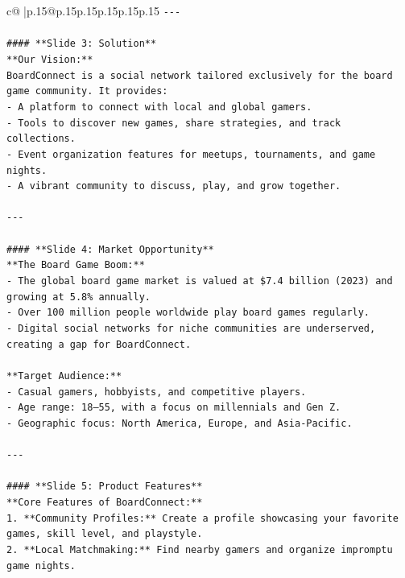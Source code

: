 \documentclass{article}
\begin{document}
{\begin{supertabular}{c@{$\;$}|p{.15\linewidth}@{}p{.15\linewidth}p{.15\linewidth}p{.15\linewidth}p{.15\linewidth}p{.15\linewidth}}
{{{\texttt{{-}{-}{-}} \\
\\ 
\texttt{\#\#\#\# **Slide 3: Solution**} \\
\texttt{**Our Vision:**  } \\
\texttt{BoardConnect is a social network tailored exclusively for the board game community. It provides:  } \\
\texttt{{-} A platform to connect with local and global gamers.  } \\
\texttt{{-} Tools to discover new games, share strategies, and track collections.  } \\
\texttt{{-} Event organization features for meetups, tournaments, and game nights.  } \\
\texttt{{-} A vibrant community to discuss, play, and grow together.} \\
\\ 
\texttt{{-}{-}{-}} \\
\\ 
\texttt{\#\#\#\# **Slide 4: Market Opportunity**} \\
\texttt{**The Board Game Boom:**  } \\
\texttt{{-} The global board game market is valued at \$7.4 billion (2023) and growing at 5.8\% annually.  } \\
\texttt{{-} Over 100 million people worldwide play board games regularly.  } \\
\texttt{{-} Digital social networks for niche communities are underserved, creating a gap for BoardConnect.  } \\
\\ 
\texttt{**Target Audience:**  } \\
\texttt{{-} Casual gamers, hobbyists, and competitive players.  } \\
\texttt{{-} Age range: 18–55, with a focus on millennials and Gen Z.  } \\
\texttt{{-} Geographic focus: North America, Europe, and Asia{-}Pacific.} \\
\\ 
\texttt{{-}{-}{-}} \\
\\ 
\texttt{\#\#\#\# **Slide 5: Product Features**} \\
\texttt{**Core Features of BoardConnect:**  } \\
\texttt{1. **Community Profiles:** Create a profile showcasing your favorite games, skill level, and playstyle.  } \\
\texttt{2. **Local Matchmaking:** Find nearby gamers and organize impromptu game nights.  } \\
}}}
\end{supertabular}}
\end{document}
